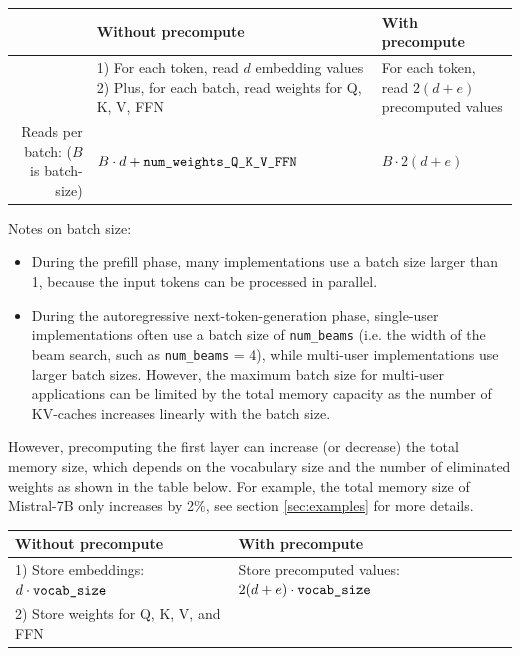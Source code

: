 \documentclass{article}
\begin{document}
\begingroup \renewcommand{\arraystretch}{1.3} %
\begin{center} \begin{tabular}{r|l|l}
  & \textbf{Without precompute}            & \textbf{With precompute}    \\ \hline
    & \makecell[l]{1) For each token, read $d$ embedding values          \\
      2) Plus, for each batch, read weights for Q, K, V, FFN}
    & \makecell[l]{For each token, read $2(d+e)$ \\  precomputed values} \\ \hline
  \makecell[l]{Reads per batch: \\ ($B$ is batch-size)} & $B \cdot d + \verb+num_weights_Q_K_V_FFN+$ & $B \cdot 2(d+e)$
\end{tabular} \end{center} \endgroup

Notes on batch size:
\begin{itemize}[topsep=-1pt, itemsep=-1pt]
  \item During the prefill phase, many implementations use a batch size larger than 1, because the input tokens can be processed in parallel.
  \item During the autoregressive next-token-generation phase, single-user implementations often use a batch size of \verb+num_beams+ (i.e. the width of the beam search, such as \verb+num_beams+ = 4), while multi-user implementations use larger batch sizes. However, the maximum batch size for multi-user applications can be limited by the total memory capacity as the number of KV-caches increases linearly with the batch size.
\end{itemize}

However, precomputing the first layer can increase (or decrease) the total memory size, which depends on the vocabulary size and the number of eliminated weights as shown in the table below. For example, the total memory size of Mistral-7B only increases by 2\%, see section \ref{sec:examples} for more details.

\begingroup \renewcommand{\arraystretch}{1.3} %
\begin{center} \begin{tabular}{l|l}
  \textbf{Without precompute}                      & \textbf{With precompute} \\ \hline
  1) Store embeddings: $d \cdot \verb+vocab_size+$ & Store precomputed values: $2(d+e) \cdot \verb+vocab_size+$ \\
  2) Store weights for Q, K, V, and FFN            &                          \\ \hline
\end{tabular} \end{center} \endgroup
\end{document}
